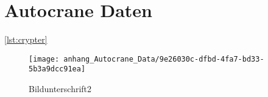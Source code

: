 \chapter{Autocrane Daten}
\label{appendix:AutocraneDaten}


\ref{lst:crypter}





\begin{figure}[h]
	\centering
	\texttt{[image: anhang\_Autocrane\_Data/9e26030c-dfbd-4fa7-bd33-5b3a9dcc91ea]}
	\caption[Beschreibung für Verzeichnis2]{Bildunterschrift2}
	\label{img:microprofile_components}
\end{figure}